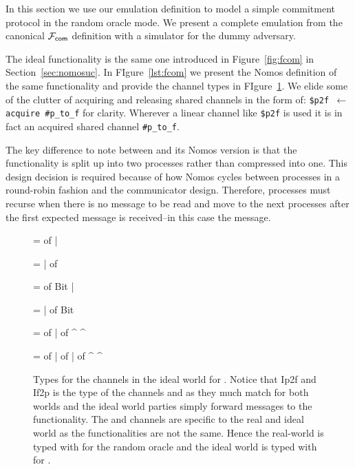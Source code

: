 In this section we use our emulation definition to model a simple commitment protocol in the random oracle mode.
We present a complete emulation from the canonical $\mathcal{F}_{{\mathsf {com}}}$ definition with a simulator for the dummy adversary.

The ideal functionality \Fcom is the same one introduced in Figure~\ref{fig:fcom} in Section~\ref{sec:nomosuc}. 
In FIgure~\ref{lst:fcom} we present the Nomos definition of the same functionality and provide the channel types in FIgure~\ref{fig:fcomtypes}.
We elide some of the clutter of acquiring and releasing shared channels in the form of: \texttt{\$p2f $\leftarrow$ acquire \#p\_to\_f} for clarity. 
Wherever a linear channel like \texttt{\$p2f} is used it is in fact an acquired shared channel \texttt{\#p\_to\_f}.

The key difference to note between \Fcom and its Nomos version is that the functionality is split up into two processes rather than compressed into one.
This design decision is required because of how Nomos cycles between processes in a round-robin fashion and the communicator design.
Therefore, processes must recurse when there is no message to be read and move to the next processes after the first expected message is received--in this case the  message.

\begin{figure}
\centering
{}  =  of  | 

  =  |  of 

  =  of Bit | 

  =  |  of Bit

  =  of  |  of  \textasciicircum {} \textasciicircum {}

  =  of  |  of  |  of  \textasciicircum {} \textasciicircum {}

\caption{Types for the channels in the ideal world for \Fcom. Notice that Ip2f and If2p is the type of the channels  and  as they much match for both worlds and the ideal world parties simply forward messages to the functionality. The  and  channels are specific to the real and ideal world as the functionalities are not the same. Hence the real-world  is typed with  for the random oracle and the ideal world  is typed with  for \Fcom.}
\label{fig:fcomtypes}
\end{figure}

